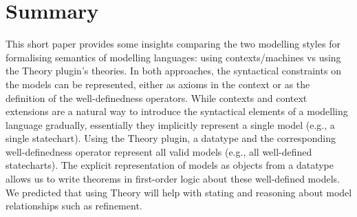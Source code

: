 \section{Summary}
\label{sec:summary}

This short paper provides some insights comparing the two modelling styles for formalising semantics of modelling languages: using \EventB contexts/machines vs using the Theory plugin's theories. In both approaches, the syntactical constraints on the models can be represented, either as axioms in the context or as the definition of the well-definedness operators.  While contexts and context extensions are a natural way to introduce the syntactical elements of a modelling language gradually, essentially they implicitly represent a single model (e.g., a single statechart). Using the Theory plugin, a datatype and the corresponding well-definedness operator represent all valid models (e.g., all well-defined statecharts).  The explicit representation of models as objects from a datatype allows us to write theorems in first-order logic about these well-defined models. We predicted that using Theory will help with stating and reasoning about model relationships such as refinement.